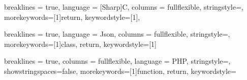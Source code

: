 
{
    breaklines = true,
    language = [Sharp]C,
    columns = fullflexible,
    stringstyle=\color{eclipse_blue},
    morekeywords=[1]{return}, 
    keywordstyle=[1]\color{eclipse_red},
}

\newcommand{\csinline}[1]{\lstinline[style = cs, basicstyle = \ttfamily\normalsize]{#1}}




{
    breaklines = true,
    language = Json,
    columns = fullflexible,
    stringstyle=\color{eclipse_blue},
    morekeywords=[1]{class, return}, 
    keywordstyle=[1]\color{eclipse_red}
}


{
    breaklines = true,
    columns = fullflexible,
    language = PHP,
    stringstyle=\color{eclipse_red},
    showstringspaces=false,
    morekeywords=[1]{function, return}, 
    keywordstyle=\color{eclipse_blue}
 }
